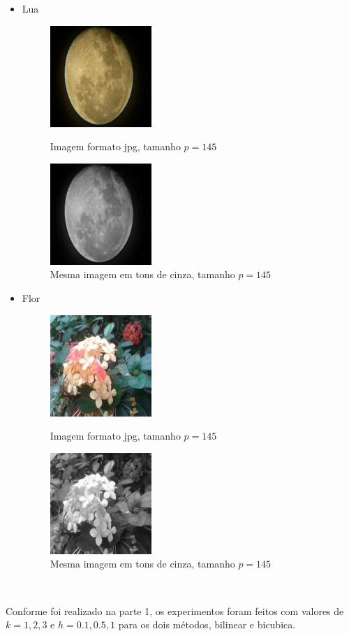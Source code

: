 \documentclass{article}
\begin{document}
	\begin{itemize}
		\item Lua
	\begin{figure}[!hbt]
		\centering
		\includegraphics[width=0.2\linewidth]{imgs/lua.jpg}
		\caption{Imagem formato jpg, tamanho $p = 145$}
				\includegraphics[width=0.2\linewidth]{imgs/lua_gray.jpg}
				\caption{Mesma imagem em tons de cinza, tamanho $p = 145$}
	\end{figure}
	
			\item Flor
			\begin{figure}[!hbt]
				\centering
				\includegraphics[width=0.2\linewidth]{imgs/flor.jpg}
				\caption{Imagem formato jpg, tamanho $p = 145$}
				
					\includegraphics[width=0.2\linewidth]{imgs/flor_gray.jpg}
					\caption{Mesma imagem em tons de cinza, tamanho $p = 145$}
			\end{figure}\\
			
	\end{itemize}
	\newpage
	Conforme foi realizado na parte 1, os experimentos foram feitos com valores de $k = 1, 2, 3$ e $h = 0.1, 0.5, 1$ para os dois métodos, bilinear e bicubica.\\
\end{document}
